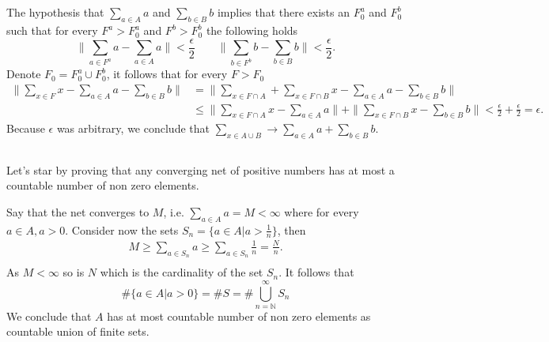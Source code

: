 \documentclass[a4paper,12pt]{article} %
\begin{document}
\subsection{}
The hypothesis that \(\sum_{a \in  A}a  \) and \(\sum_{b \in  B}b  \) implies that there exists an \(F_0^a\) and \(F_0^b\) such that for every \(F^a>F_0^a\) and \(F^b>F_0^b\) the following holds
\begin{equation}
    \| \sum_{a \in  F^a}a - \sum_{a \in  A}a   \| < \frac{\epsilon}{2} \quad \quad \| \sum_{b \in  F^b}b - \sum_{b \in  B}b   \|< \frac{\epsilon}{2}.
\end{equation}
Denote \(F_0 = F_0^a \cup F_0^b\), it follows that for every \(F > F_0\)
\begin{align*}
    \| \sum_{x \in  F}x - \sum_{a\in A}a - \sum_{b \in  B }b    \| & = \| \sum_{x \in  F \cap A} + \sum_{x \in F \cap B}x - \sum_{a \in  A}a - \sum_{b \in  B}b     \|                                                             \\
                                                                   & \leq \| \sum_{x \in  F \cap A}x - \sum_{a \in  A}a   \|+\| \sum_{x \in F \cap B}x - \sum_{b \in  B }b \|< \frac{\epsilon}{2} + \frac{\epsilon}{2} = \epsilon.
\end{align*}
Because \(\epsilon\) was arbitrary, we conclude that \(\sum_{x \in A \cup B}\to \sum_{a \in  A} a + \sum_{b \in  B}b   \).

\subsection{}

Let's star by proving that any converging net of positive numbers has at most a countable number of non zero elements.

Say that the net converges to \(M\), i.e. \(\sum_{a \in  A} a = M <\infty  \) where for every \(a \in A, a>0\). Consider now the sets \(S_n = \{ a \in  A | a> \frac{1}{n} \} \), then
\begin{align*}
    M \geq \sum_{a \in  S_n}a \geq  \sum_{a \in  S_n}\frac{1}{n}= \frac{N}{n}. \\
\end{align*}
As \(M < \infty \)  so is \(N\) which is the cardinality of the set \(S_n\).
It follows that
\begin{equation}
    \# \{ a \in  A | a>0 \}= \# S = \# \bigcup_{n=\mathbb{N}}^{\infty} S_n
\end{equation}
We conclude that \(A\) has at most countable number of non zero elements as countable union of finite sets.
\end{document}
